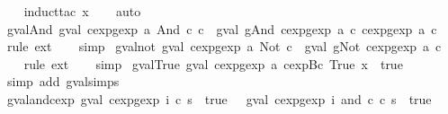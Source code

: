 \begin{isabellebody}
%
\isadelimproof
\ \ %
\endisadelimproof
%
\isatagproof
{}\isamarkupfalse%
\ {\isacharparenleft}induct{\isacharunderscore}tac\ x{\isacharparenright}\isanewline
\ \ \isamarkupfalse%
\ auto%
\endisatagproof
{\isafoldproof}%
%
\isadelimproof
\isanewline
%
\endisadelimproof
\isanewline
{}\isamarkupfalse%
\ gval{\isacharunderscore}And{\isacharcolon}\ {\isachardoublequoteopen}gval\ {\isacharparenleft}cexp{}gexp\ a\ {\isacharparenleft}And\ c{}\ c{}{\isacharparenright}{\isacharparenright}\ {\isacharequal}\ gval\ {\isacharparenleft}gAnd\ {\isacharparenleft}cexp{}gexp\ a\ c{}{\isacharparenright}\ {\isacharparenleft}cexp{}gexp\ a\ c{}{\isacharparenright}{\isacharparenright}{\isachardoublequoteclose}\isanewline
%
\isadelimproof
\ \ %
\endisadelimproof
%
\isatagproof
{}\isamarkupfalse%
\ {\isacharparenleft}rule\ ext{\isacharparenright}\isanewline
\ \ \isamarkupfalse%
\ simp%
\endisatagproof
{\isafoldproof}%
%
\isadelimproof
\isanewline
%
\endisadelimproof
\isanewline
{}\isamarkupfalse%
\ gval{\isacharunderscore}not{\isacharcolon}\ {\isachardoublequoteopen}gval\ {\isacharparenleft}cexp{}gexp\ a\ {\isacharparenleft}Not\ c{\isacharparenright}{\isacharparenright}\ {\isacharequal}\ gval\ {\isacharparenleft}gNot\ {\isacharparenleft}cexp{}gexp\ a\ c{\isacharparenright}{\isacharparenright}{\isachardoublequoteclose}\isanewline
%
\isadelimproof
\ \ %
\endisadelimproof
%
\isatagproof
{}\isamarkupfalse%
\ {\isacharparenleft}rule\ ext{\isacharparenright}\isanewline
\ \ \isamarkupfalse%
\ simp%
\endisatagproof
{\isafoldproof}%
%
\isadelimproof
\isanewline
%
\endisadelimproof
\isanewline
{}\isamarkupfalse%
\ gval{\isacharunderscore}True{\isacharcolon}\ {\isachardoublequoteopen}gval\ {\isacharparenleft}cexp{}gexp\ a\ {\isacharparenleft}cexp{\isachardot}Bc\ True{\isacharparenright}{\isacharparenright}\ x\ {\isacharequal}\ true{\isachardoublequoteclose}\isanewline
%
\isadelimproof
\ \ %
\endisadelimproof
%
\isatagproof
{}\isamarkupfalse%
\ {\isacharparenleft}simp\ add{\isacharcolon}\ gval{\isachardot}simps{\isacharparenright}%
\endisatagproof
{\isafoldproof}%
%
\isadelimproof
\isanewline
%
\endisadelimproof
\isanewline
{}\isamarkupfalse%
\ gval{\isacharunderscore}and{\isacharunderscore}cexp{\isacharcolon}\ {\isachardoublequoteopen}gval\ {\isacharparenleft}cexp{}gexp\ i\ c{}{\isacharparenright}\ s\ {\isasymnoteq}\ true\ {\isasymLongrightarrow}\ \ gval\ {\isacharparenleft}cexp{}gexp\ i\ {\isacharparenleft}and\ c{}\ c{}{\isacharparenright}{\isacharparenright}\ s\ {\isasymnoteq}\ true{\isachardoublequoteclose}\isanewline

\end{isabellebody}
